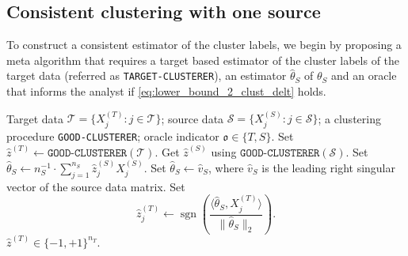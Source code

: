 \documentclass[10pt]{article}
\newcommand{\sgn}{\operatorname{sgn}}
\newcommand{\wh}{\widehat}
\newcommand{\calT}{\mathcal T}
\newcommand{\trg}{T}
\newcommand{\nT}{n_{\trg}}
\newcommand{\Xtar}{X^{(\trg)}}
\newcommand{\hatztar}{\wh{z}^{(\trg)}}
\newcommand{\calS}{\mathcal S}
\newcommand{\src}{S}
\newcommand{\thetaS}{\theta_{\src}}
\newcommand{\nS}{n_{\src}}
\newcommand{\Xsrc}{X^{(\src)}}
\newcommand{\hatthetaS}{\wh{\theta}_S}
\begin{document}
\subsection{Consistent clustering with one source}
\label{sec:cons_clust_one_source}
To construct a consistent estimator of the cluster labels, we begin by proposing a meta algorithm that requires a target based estimator of the cluster labels of the target data (referred as \texttt{TARGET-CLUSTERER}), an estimator $\wh{\theta}_S$ of $\thetaS$ and an oracle that informs the analyst if \eqref{eq:lower_bound_2_clust_delt} holds.
\begin{algorithm}[tb]
\caption{Meta Algorithm for Transfer-Assisted Clustering with One Source}
\label{alg:meta_oracle_transfer_clustering_two_community}
\begin{algorithmic}[1]
\Require Target data $\calT=\{\Xtar_j:j\in\calT\}$; source data
$\calS=\{\Xsrc_j:j\in\calS\}$; a clustering procedure
\texttt{GOOD-CLUSTERER}; oracle indicator
$\mathfrak o\in\{\trg,\src\}$.
\If{$\mathfrak o=\trg$}
    \State Set
    $\hatztar\gets\texttt{GOOD-CLUSTERER}(\calT)$.
\Else
 \If{$d\gg\nS$}
   \State Get $\wh{z}^{(\src)}$ using $\texttt{GOOD-CLUSTERER}(\calS)$.
   \State Set $\hatthetaS \gets n^{-1}_\src \cdot \sum_{j=1}^{\nS}\wh z^{(\src)}_j\Xsrc_j$.
 \Else 
 \State Set $\hatthetaS \gets \wh v_\src$, where $\wh v_\src$ is the leading right singular vector of the source data matrix.
 \EndIf
    \For{$j\in\calT$}
        \State Set
        \[
            \hatztar_j
            \gets
            \sgn\!\left(
            \frac{\langle\hatthetaS,\Xtar_j\rangle}
            {\|\hatthetaS\|_2}
            \right).
        \]
    \EndFor
\EndIf
\Output $\hatztar\in\{-1,+1\}^{\nT}$.
\end{algorithmic}
\end{algorithm}
\end{document}
